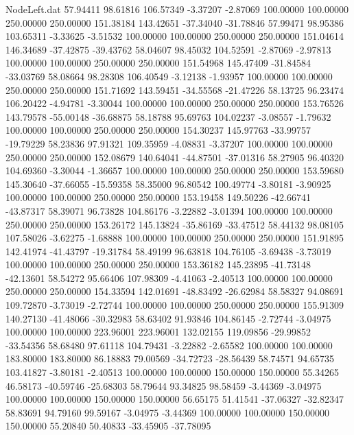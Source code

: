 \begin{filecontents}{NodeLeft.dat}
  57.94411   98.61816  106.57349    -3.37207   -2.87069  100.00000  100.00000  250.00000  250.00000  151.38184  143.42651  -37.34040  -31.78846
  57.99471   98.95386  103.65311    -3.33625   -3.51532  100.00000  100.00000  250.00000  250.00000  151.04614  146.34689  -37.42875  -39.43762
  58.04607   98.45032  104.52591    -2.87069   -2.97813  100.00000  100.00000  250.00000  250.00000  151.54968  145.47409  -31.84584  -33.03769
  58.08664   98.28308  106.40549    -3.12138   -1.93957  100.00000  100.00000  250.00000  250.00000  151.71692  143.59451  -34.55568  -21.47226
  58.13725   96.23474  106.20422    -4.94781   -3.30044  100.00000  100.00000  250.00000  250.00000  153.76526  143.79578  -55.00148  -36.68875
  58.18788   95.69763  104.02237    -3.08557   -1.79632  100.00000  100.00000  250.00000  250.00000  154.30237  145.97763  -33.99757  -19.79229
  58.23836   97.91321  109.35959    -4.08831   -3.37207  100.00000  100.00000  250.00000  250.00000  152.08679  140.64041  -44.87501  -37.01316
  58.27905   96.40320  104.69360    -3.30044   -1.36657  100.00000  100.00000  250.00000  250.00000  153.59680  145.30640  -37.66055  -15.59358
  58.35000   96.80542  100.49774    -3.80181   -3.90925  100.00000  100.00000  250.00000  250.00000  153.19458  149.50226  -42.66741  -43.87317
  58.39071   96.73828  104.86176    -3.22882   -3.01394  100.00000  100.00000  250.00000  250.00000  153.26172  145.13824  -35.86169  -33.47512
  58.44132   98.08105  107.58026    -3.62275   -1.68888  100.00000  100.00000  250.00000  250.00000  151.91895  142.41974  -41.43797  -19.31784
  58.49199   96.63818  104.76105    -3.69438   -3.73019  100.00000  100.00000  250.00000  250.00000  153.36182  145.23895  -41.73148  -42.13601
  58.54272   95.66406  107.98309    -4.41063   -2.40513  100.00000  100.00000  250.00000  250.00000  154.33594  142.01691  -48.83492  -26.62984
  58.58327   94.08691  109.72870    -3.73019   -2.72744  100.00000  100.00000  250.00000  250.00000  155.91309  140.27130  -41.48066  -30.32983
  58.63402   91.93846  104.86145    -2.72744   -3.04975  100.00000  100.00000  223.96001  223.96001  132.02155  119.09856  -29.99852  -33.54356
  58.68480   97.61118  104.79431    -3.22882   -2.65582  100.00000  100.00000  183.80000  183.80000   86.18883   79.00569  -34.72723  -28.56439
  58.74571   94.65735  103.41827    -3.80181   -2.40513  100.00000  100.00000  150.00000  150.00000   55.34265   46.58173  -40.59746  -25.68303
  58.79644   93.34825   98.58459    -3.44369   -3.04975  100.00000  100.00000  150.00000  150.00000   56.65175   51.41541  -37.06327  -32.82347
  58.83691   94.79160   99.59167    -3.04975   -3.44369  100.00000  100.00000  150.00000  150.00000   55.20840   50.40833  -33.45905  -37.78095

\end{filecontents}
